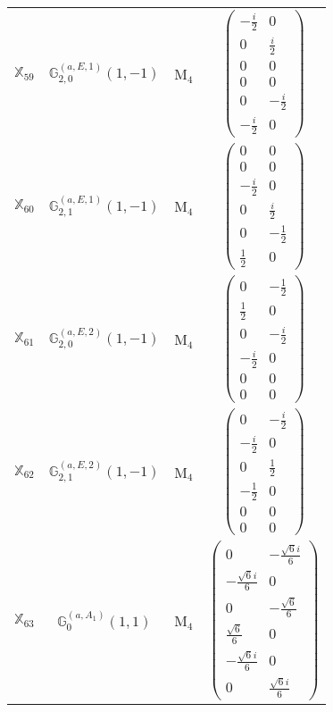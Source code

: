 \documentclass[fleqn,10pt,landscape]{article}
\begin{document}
\begin{itemize}
\begin{center}
\begin{longtable}{c|c|c|c}
$ \mathbb{X}_{59} $ & $\mathbb{G}_{2,0}^{(a,E,1)}(1,-1)$ & M$_{4}$ & $\begin{pmatrix} - \frac{i}{2} & 0 \\ 0 & \frac{i}{2} \\ 0 & 0 \\ 0 & 0 \\ 0 & - \frac{i}{2} \\ - \frac{i}{2} & 0 \end{pmatrix}$ \\
$ \mathbb{X}_{60} $ & $\mathbb{G}_{2,1}^{(a,E,1)}(1,-1)$ & M$_{4}$ & $\begin{pmatrix} 0 & 0 \\ 0 & 0 \\ - \frac{i}{2} & 0 \\ 0 & \frac{i}{2} \\ 0 & - \frac{1}{2} \\ \frac{1}{2} & 0 \end{pmatrix}$ \\
$ \mathbb{X}_{61} $ & $\mathbb{G}_{2,0}^{(a,E,2)}(1,-1)$ & M$_{4}$ & $\begin{pmatrix} 0 & - \frac{1}{2} \\ \frac{1}{2} & 0 \\ 0 & - \frac{i}{2} \\ - \frac{i}{2} & 0 \\ 0 & 0 \\ 0 & 0 \end{pmatrix}$ \\
$ \mathbb{X}_{62} $ & $\mathbb{G}_{2,1}^{(a,E,2)}(1,-1)$ & M$_{4}$ & $\begin{pmatrix} 0 & - \frac{i}{2} \\ - \frac{i}{2} & 0 \\ 0 & \frac{1}{2} \\ - \frac{1}{2} & 0 \\ 0 & 0 \\ 0 & 0 \end{pmatrix}$ \\
$ \mathbb{X}_{63} $ & $\mathbb{G}_{0}^{(a,A_{1})}(1,1)$ & M$_{4}$ & $\begin{pmatrix} 0 & - \frac{\sqrt{6} i}{6} \\ - \frac{\sqrt{6} i}{6} & 0 \\ 0 & - \frac{\sqrt{6}}{6} \\ \frac{\sqrt{6}}{6} & 0 \\ - \frac{\sqrt{6} i}{6} & 0 \\ 0 & \frac{\sqrt{6} i}{6} \end{pmatrix}$ \\

\end{longtable}
\end{center}
\end{itemize}
\end{document}
